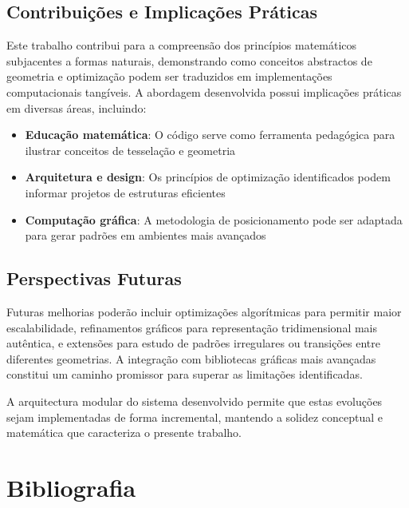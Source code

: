\documentclass[12pt,a4paper,oneside]{extarticle}
\begin{document}
\subsection{Contribuições e Implicações Práticas}

Este trabalho contribui para a compreensão dos princípios matemáticos subjacentes a formas naturais, demonstrando como conceitos abstractos de geometria e optimização podem ser traduzidos em implementações computacionais tangíveis. A abordagem desenvolvida possui implicações práticas em diversas áreas, incluindo:

\begin{itemize}
    \item \textbf{Educação matemática}: O código serve como ferramenta pedagógica para ilustrar conceitos de tesselação e geometria
    \item \textbf{Arquitetura e design}: Os princípios de optimização identificados podem informar projetos de estruturas eficientes
    \item \textbf{Computação gráfica}: A metodologia de posicionamento pode ser adaptada para gerar padrões em ambientes mais avançados
\end{itemize}

\subsection{Perspectivas Futuras}

Futuras melhorias poderão incluir optimizações algorítmicas para permitir maior escalabilidade, refinamentos gráficos para representação tridimensional mais autêntica, e extensões para estudo de padrões irregulares ou transições entre diferentes geometrias. A integração com bibliotecas gráficas mais avançadas constitui um caminho promissor para superar as limitações identificadas.

A arquitectura modular do sistema desenvolvido permite que estas evoluções sejam implementadas de forma incremental, mantendo a solidez conceptual e matemática que caracteriza o presente trabalho.


\section{Bibliografia}
\end{document}
